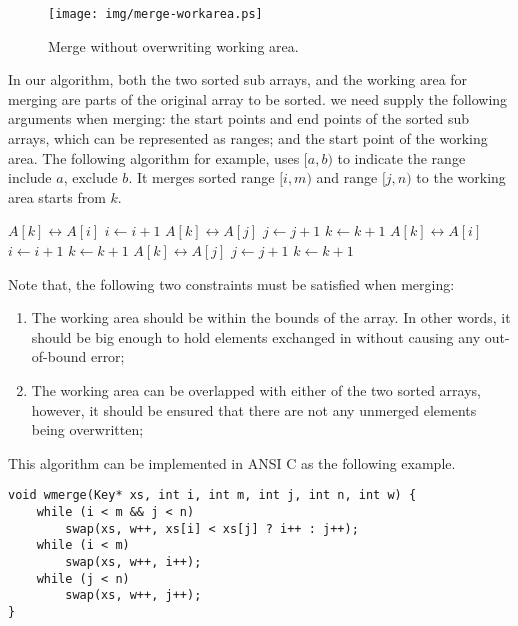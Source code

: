 \documentclass[UTF8]{article}
\begin{document}
\begin{figure}[htbp]
 \centering
 \texttt{[image: img/merge-workarea.ps]}
 \caption{Merge without overwriting working area.}
 \label{fig:merge-workarea}
\end{figure}

In our algorithm, both the two sorted sub arrays, and the working area for merging are parts of the
original array to be sorted. we need supply the following arguments when merging: the start points and end
points of the sorted sub arrays, which can be represented as ranges; and the start point of the working
area. The following algorithm for example, uses $[a, b)$ to indicate the range include $a$,
exclude $b$. It merges sorted range $[i, m)$ and range $[j, n)$ to the working area starts from $k$.

\begin{algorithmic}[1]
\Procedure{Merge}{$A, [i, m), [j, n), k$}
      \State {} $A[k] \leftrightarrow A[i]$
      \State $i \gets i + 1$
    \Else
      \State {} $A[k] \leftrightarrow A[j]$
      \State $j \gets j + 1$
    \EndIf
    \State $k \gets k + 1$
  \EndWhile
    \State {} $A[k] \leftrightarrow A[i]$
    \State $i \gets i + 1$
    \State $k \gets k + 1$
  \EndWhile
    \State {} $A[k] \leftrightarrow A[j]$
    \State $j \gets j + 1$
    \State $k \gets k + 1$
  \EndWhile
\EndProcedure
\end{algorithmic}

Note that, the following two constraints must be satisfied when merging:

\begin{enumerate}
\item The working area should be within the bounds of the array. In other words, it should be big
enough to hold elements exchanged in without causing any out-of-bound error;
\item The working area can be overlapped with either of the two sorted arrays, however, it should
be ensured that there are not any unmerged elements being overwritten;
\end{enumerate}

This algorithm can be implemented in ANSI C as the following example.

\lstset{language=C}
\begin{lstlisting}
void wmerge(Key* xs, int i, int m, int j, int n, int w) {
    while (i < m && j < n)
        swap(xs, w++, xs[i] < xs[j] ? i++ : j++);
    while (i < m)
        swap(xs, w++, i++);
    while (j < n)
        swap(xs, w++, j++);
}
\end{lstlisting}
\end{document}
